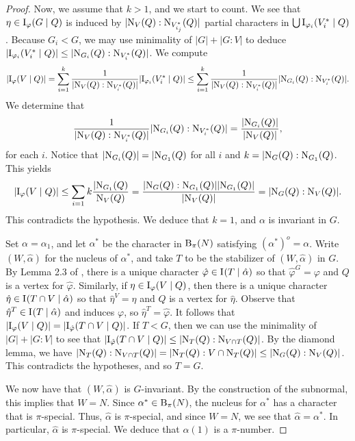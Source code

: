 \documentclass[12pt]{article}
\def\norm#1#2{{\textrm N}_{#1} (#2)}
\def\B#1#2{{\textrm B}_{#1} (#2)}
\def\Bpi#1{\B {\pi}{#1}}
\def\phi{\varphi}
\newcommand \IIpi[3] {{\textrm I}_{#1} (#2 \mid #3)}
\begin{document}
\begin{proof}
Now, we assume that $k > 1$, and we start to count.  We see that
$\eta \in \IIpi {\phi}GQ$ is induced by $|\norm VQ:\norm
{V^*_{i_j}}Q|$ partial characters in $\bigcup \IIpi
{\phi_i}{V^*_i}Q$.  Because $G_i < G$, we may use minimality of $|G|
+ |G:V|$ to deduce $|\IIpi {\phi_i}{V^*_i}Q| \le |\norm {G_i}Q:\norm
{V^*_i}Q|$. We compute
$$
|\IIpi {\phi}VQ| = \sum_{i=1}^k \frac 1{|\norm VQ:\norm {V^*_i}Q|}
|\IIpi {\phi_i}{V^*_i}Q| \le \sum_{i=1}^k \frac 1{|\norm VQ:\norm
{V^*_i}Q|} |\norm {G_i}Q:\norm {V^*_i}Q|.
$$
We determine that
$$
\frac 1{|\norm VQ:\norm {V^*_i}Q|} |\norm {G_i}Q:\norm {V^*_i}Q| =
\frac {|\norm {G_i}Q|}{|\norm VQ|},
$$
for each $i$.   Notice that
$|\norm {G_i}Q| = |\norm {G_1}Q$ for all $i$ and $k = |\norm GQ:
\norm {G_1} Q$. This yields
$$
|\IIpi {\phi}VQ| \le \sum_{i=1}k \frac {|\norm {G_1}Q}{\norm VQ} =
\frac {|\norm GQ:\norm {G_1}Q| |\norm {G_1}Q|}{|\norm VQ|} = |\norm
GQ:\norm VQ|.
$$
This contradicts the hypothesis.  We deduce that $k = 1$, and
$\alpha$ is invariant in $G$.

Set $\alpha = \alpha_1$, and let $\alpha^*$ be the character in
$\Bpi N$ satisfying $(\alpha^*)^o = \alpha$.  Write $(W,\hat\alpha)$
for the nucleus of $\alpha^*$, and take $T$ to be the stabilizer of
$(W,\hat\alpha)$ in $G$. By Lemma 2.3 of \cite{Laradji}, there is a
unique character $\hat\phi \in \IIpi {}T{\hat\alpha}$ so that
$\hat\phi^G = \phi$ and $Q$ is a vertex for $\hat\phi$.  Similarly,
if $\eta \in \IIpi {\phi}VQ$, then there is a unique character
$\hat\eta \in \IIpi {}{T \cap V}{\hat\alpha}$ so that $\hat\eta^V =
\eta$ and $Q$ is a vertex for $\hat\eta$. Observe that $\hat\eta^T
\in \IIpi {}T{\hat\alpha}$ and induces $\phi$, so $\hat\eta^T =
\hat\phi$.  It follows that $|\IIpi {\phi}VQ| = |\IIpi {\hat\phi}{T
\cap V}Q|$.  If $T < G$, then we can use the minimality of $|G| +
|G:V|$ to see that $|\IIpi {\hat\phi}{T \cap V}Q| \le |\norm TQ:
\norm {V \cap T}Q|$.  By the diamond lemma, we have $|\norm TQ:
\norm {V \cap T}Q| = |\norm TQ: V \cap \norm TQ| \le |\norm GQ :
\norm VQ|$.  This contradicts the hypotheses, and so $T = G$.

We now have that $(W,\hat\alpha)$ is $G$-invariant.  By the
construction of the subnormal, this implies that $W = N$.  Since
$\alpha^* \in \Bpi N$, the nucleus for $\alpha^*$ has a character
that is $\pi$-special.  Thus, $\hat\alpha$ is $\pi$-special, and
since $W = N$, we see that $\hat\alpha = \alpha^*$.  In particular,
$\hat\alpha$ is $\pi$-special.  We deduce that $\alpha (1)$ is a
$\pi$-number.


\end{proof}
\end{document}
